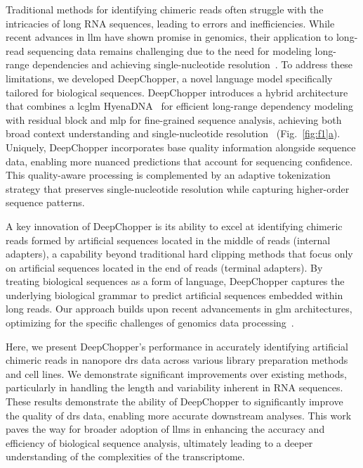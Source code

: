 \documentclass[pdflatex, sn-mathphys-num, lineno]{sn-jnl}%
\newcommand{\figref}[2]{Fig.~\hyperref[#1]{\ref*{#1}#2}}
\theoremstyle{thmstyleone}%
\theoremstyle{thmstyletwo}%
\theoremstyle{thmstylethree}%
\begin{document}
Traditional methods for identifying chimeric reads often struggle with the intricacies of long RNA sequences, leading to errors and inefficiencies.
While recent advances in \gls{llm} have shown promise in genomics, their application to long-read sequencing data remains challenging due to the need for modeling long-range dependencies and achieving single-nucleotide resolution~\cite{dalla2023nucleotide, tay2022efficient, zhou2023dnabert2}.
To address these limitations, we developed DeepChopper, a novel language model specifically tailored for biological sequences.
DeepChopper introduces a hybrid architecture that combines a \gls{lcglm} HyenaDNA~\cite{nguyen2024hyenadna} for efficient long-range dependency modeling with residual block and \gls{mlp} for fine-grained sequence analysis, achieving both broad context understanding and single-nucleotide resolution~\cite{poli2023hyena, he2016deep} (\figref{fig:f1}{a}).
Uniquely, DeepChopper incorporates base quality information alongside sequence data, enabling more nuanced predictions that account for sequencing confidence.
This quality-aware processing is complemented by an adaptive tokenization strategy that preserves single-nucleotide resolution while capturing higher-order sequence patterns.

A key innovation of DeepChopper is its ability to excel at identifying chimeric reads formed by artificial sequences located in the middle of reads (internal adapters), a capability beyond traditional hard clipping methods that focus only on artificial sequences located in the end of reads (terminal adapters).
By treating biological sequences as a form of language, DeepChopper captures the underlying biological grammar to predict artificial sequences embedded within long reads.
Our approach builds upon recent advancements in \gls{glm} architectures, optimizing for the specific challenges of genomics data processing~\cite{nguyen2024hyenadna}.

Here, we present DeepChopper's performance in accurately identifying artificial chimeric reads in nanopore \gls{drs} data across various library preparation methods and cell lines.
We demonstrate significant improvements over existing methods, particularly in handling the length and variability inherent in RNA sequences.
These results demonstrate the ability of DeepChopper to significantly improve the quality of \gls{drs} data, enabling more accurate downstream analyses.
This work paves the way for broader adoption of \glspl{llm} in enhancing the accuracy and efficiency of biological sequence analysis, ultimately leading to a deeper understanding of the complexities of the transcriptome.
\end{document}
